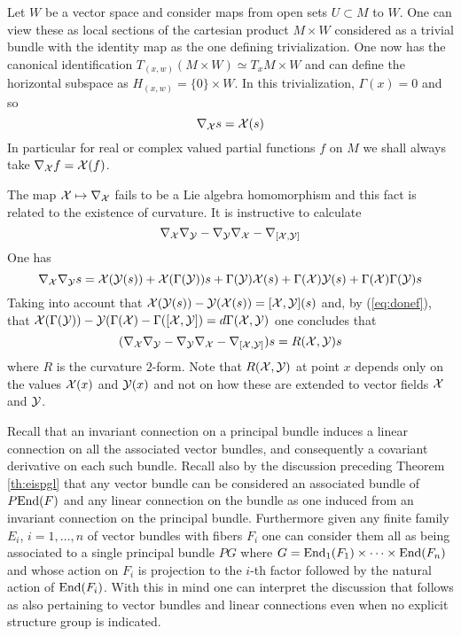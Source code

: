 \documentclass[12pt,titlepage]{article}
\def\cX{{\cal X}}
\def\cY{{\cal Y}}
\def\End{\hbox{End}}
\begin{document}
Let \(W\) be a vector space and consider maps from open sets \(U\subset M\)
to \(W\). One can view these as local sections of the cartesian product 
\(M\times W\) considered as a trivial bundle with the identity map as
the one defining trivialization. One now has the canonical
identification  \(T_{(x,w)}(M \times W) \simeq T_xM \times W\) and can
define the horizontal subspace as \(H_{(x,w)}=\{0\}\times W\). In this
trivialization, \(\Gamma(x)=0\) and so
\[
\nabla_{\cX} s=\cX(s)
\]
In particular for real or complex valued partial 
functions \(f\) on \(M\) we
shall always take \(\nabla_{\cX} f=\cX(f)\).

The map \(\cX \mapsto \nabla_\cX\) fails to be a Lie algebra
homomorphism and this fact is related to the existence of curvature.
It is instructive to calculate 
\[
\nabla_\cX\nabla_\cY  -
\nabla_\cY\nabla_\cX - \nabla_{[\cX,\cY]}
\]
One has
\[
 \nabla_\cX\nabla_\cY s = \cX(\cY(s)) +
\cX(\Gamma(\cY))s +
\Gamma(\cY)\cX(s)+\Gamma(\cX)\cY(s)+\Gamma(\cX)\Gamma(\cY)s
\]
Taking into account that \(\cX(\cY(s)) - \cY(\cX(s)) =
[\cX,\cY](s)\) and, by (\ref{eq:donef}), 
that \(\cX(\Gamma(\cY)) -\cY(\Gamma(\cX) -
\Gamma([\cX,\cY]) = d\Gamma(\cX,\cY)\) one concludes that
\begin{equation}\label{eq:comcv}%
(\nabla_\cX\nabla_\cY  -
\nabla_\cY\nabla_\cX - \nabla_{[\cX,\cY]})s = R(\cX,\cY)s
\end{equation}%
where \(R\) is the curvature \(2\)-form. Note that \(R(\cX,\cY)\) at
point \(x\) depends only on the values \(\cX(x)\) and \(\cY(x)\) and not
on how these are extended to vector fields \(\cX\) and \(\cY\).

Recall that an invariant connection on a principal bundle
induces a linear connection on all
the associated vector bundles, and consequently a covariant derivative
on each such bundle. Recall also by the discussion preceding 
Theorem \ref{th:eispgl} that
any vector bundle can be considered an associated bundle of \(P\End(F)\)
and any linear connection on the bundle as one induced from an invariant
connection on the principal bundle. Furthermore given any finite family
\(E_i\), \(i=1,\dots,n\) of vector bundles with fibers \(F_i\) one can
consider them all as being associated to  a single principal bundle \(PG\)
where \(G=\End_1(F_1)\times\cdots\times \End(F_n)\) and whose action on
\(F_i\) is projection to the \(i\)-th factor followed by the natural
action of \(\End(F_i)\). With this in mind one can interpret the
discussion that follows as also pertaining to vector bundles and linear
connections even when no explicit structure group is indicated.
\end{document}
